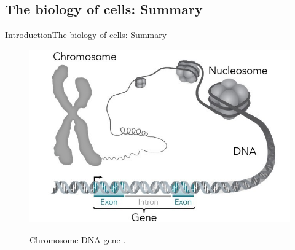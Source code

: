 \documentclass[10pt]{beamer}
\begin{document}
{%
\subsection{The biology of cells: Summary}

\begin{frame}{Introduction}{The biology of cells: Summary}
\begin{figure}[]
 \centering
    \includegraphics[width=\textwidth,height=0.6\textheight,keepaspectratio]{img/introduction/bio8.jpg}
    \label{img:mot2}
    \caption{Chromosome-DNA-gene \cite{dnacromosome2020}.}
\end{figure}
\end{frame}

}
\end{document}
